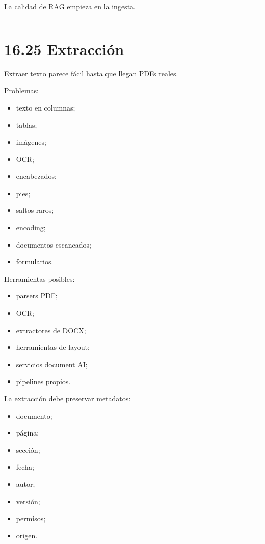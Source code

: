 La calidad de RAG empieza en la ingesta.

\begin{center}\rule{0.5\linewidth}{0.5pt}\end{center}

\section{16.25 Extracción}\label{extracciuxf3n}

Extraer texto parece fácil hasta que llegan PDFs reales.

Problemas:

\begin{itemize}
\tightlist
\item
  texto en columnas;
\item
  tablas;
\item
  imágenes;
\item
  OCR;
\item
  encabezados;
\item
  pies;
\item
  saltos raros;
\item
  encoding;
\item
  documentos escaneados;
\item
  formularios.
\end{itemize}

Herramientas posibles:

\begin{itemize}
\tightlist
\item
  parsers PDF;
\item
  OCR;
\item
  extractores de DOCX;
\item
  herramientas de layout;
\item
  servicios document AI;
\item
  pipelines propios.
\end{itemize}

La extracción debe preservar metadatos:

\begin{itemize}
\tightlist
\item
  documento;
\item
  página;
\item
  sección;
\item
  fecha;
\item
  autor;
\item
  versión;
\item
  permisos;
\item
  origen.
\end{itemize}

